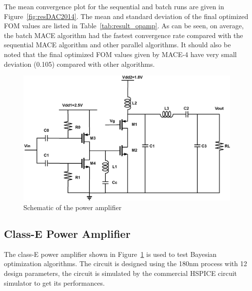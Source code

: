 The mean convergence plot for the sequential and batch runs are given in
Figure~\ref{fig:resDAC2014}. The mean and standard deviation of the final
optimized FOM values are listed in Table~\ref{tab:result_opamp}. As can be
seen, on average, the batch MACE algorithm had the fastest convergence rate
compared with the sequential MACE algorithm and other parallel algorithms. It
should also be noted that the final optimized FOM values given by MACE-4 have
very small deviation (0.105) compared with other algorithms.



\begin{figure}[!htb]
    \begin{center}
        \centerline{\includegraphics[width=\columnwidth]{./img/classE.eps}}
        \caption{Schematic of the power amplifier}
        \label{fig:schPA}
    \end{center}
    \vskip -0.15in
\end{figure}

\subsection{Class-E Power Amplifier}


The class-E power amplifier shown in Figure~\ref{fig:schPA} is used to test Bayesian optimization algorithms. The
circuit is designed using the 180nm process with 12 design parameters, the
circuit is simulated by the commercial HSPICE circuit simulator to get its performances.



